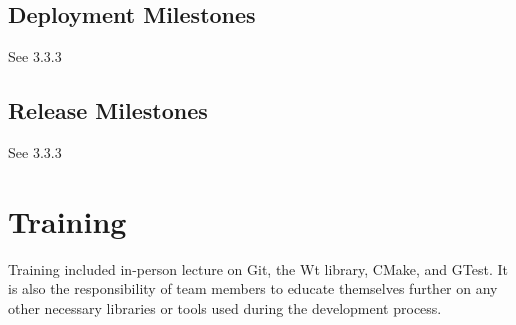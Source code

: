 \documentclass[letterpaper,12pt,oneside,listof=totoc]{scrreprt}
\begin{document}
\subsection{Deployment Milestones}
See 3.3.3

\subsection{Release Milestones}
See 3.3.3


\section{Training}

Training included in-person lecture on Git, the Wt library, CMake, and GTest. It is also the responsibility of team members to educate themselves further on any other necessary libraries or tools used during the development process. 
\end{document}

